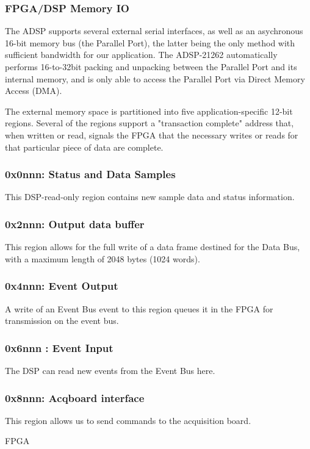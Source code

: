 \subsubsection{FPGA/DSP Memory IO}

 The ADSP supports several external serial interfaces, as well
as an asychronous 16-bit memory bus (the Parallel Port), the latter
being the only method with sufficient bandwidth for our application.
The ADSP-21262 automatically performs 16-to-32bit packing and
unpacking between the Parallel Port and its internal memory, and is
only able to access the Parallel Port via Direct Memory Access (DMA).


 The external memory space is partitioned into five
application-specific 12-bit regions. Several of the regions support a
"transaction complete" address that, when written or read, signals the
FPGA that the necessary writes or reads for that particular piece of
data are complete.  

\subsubsection{0x0nnn: Status and  Data  Samples}
This DSP-read-only region contains new sample data and status
information.



\subsubsection{0x2nnn: Output data buffer} 
 This region allows for the full write of a data frame destined
for the Data Bus, with a maximum length of 2048 bytes (1024
words).


\subsubsection{0x4nnn: Event Output} 

A write of an Event Bus event to this region queues it in the FPGA for
transmission on the event bus.


\subsubsection{0x6nnn : Event Input}
The DSP can read new events from the Event Bus here. 


\subsubsection{0x8nnn: Acqboard interface}
This region allows us to send commands to the acquisition board. 


{FPGA} 


